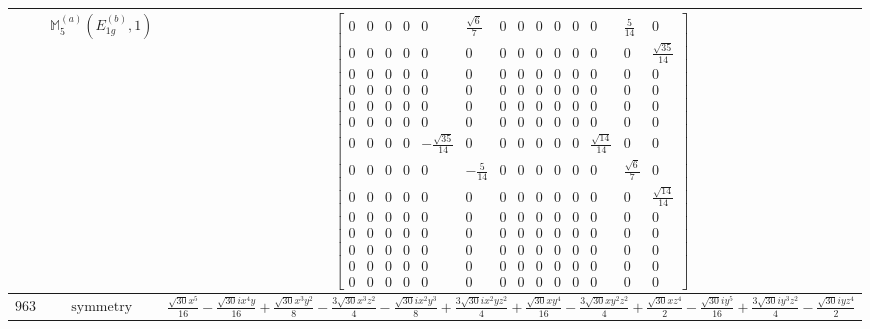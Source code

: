\documentclass[fleqn,8pt,landscape]{jsarticle}
\begin{document}
\begin{longtable}{ccc}
$  $ & $ \mathbb{M}_{5}^{(a)}(E_{1g}^{(b)},1) $ & $ \begin{bmatrix} 0 & 0 & 0 & 0 & 0 & \frac{\sqrt{6}}{7} & 0 & 0 & 0 & 0 & 0 & 0 & \frac{5}{14} & 0 \\ 0 & 0 & 0 & 0 & 0 & 0 & 0 & 0 & 0 & 0 & 0 & 0 & 0 & \frac{\sqrt{35}}{14} \\ 0 & 0 & 0 & 0 & 0 & 0 & 0 & 0 & 0 & 0 & 0 & 0 & 0 & 0 \\ 0 & 0 & 0 & 0 & 0 & 0 & 0 & 0 & 0 & 0 & 0 & 0 & 0 & 0 \\ 0 & 0 & 0 & 0 & 0 & 0 & 0 & 0 & 0 & 0 & 0 & 0 & 0 & 0 \\ 0 & 0 & 0 & 0 & 0 & 0 & 0 & 0 & 0 & 0 & 0 & 0 & 0 & 0 \\ 0 & 0 & 0 & 0 & - \frac{\sqrt{35}}{14} & 0 & 0 & 0 & 0 & 0 & 0 & \frac{\sqrt{14}}{14} & 0 & 0 \\ 0 & 0 & 0 & 0 & 0 & - \frac{5}{14} & 0 & 0 & 0 & 0 & 0 & 0 & \frac{\sqrt{6}}{7} & 0 \\ 0 & 0 & 0 & 0 & 0 & 0 & 0 & 0 & 0 & 0 & 0 & 0 & 0 & \frac{\sqrt{14}}{14} \\ 0 & 0 & 0 & 0 & 0 & 0 & 0 & 0 & 0 & 0 & 0 & 0 & 0 & 0 \\ 0 & 0 & 0 & 0 & 0 & 0 & 0 & 0 & 0 & 0 & 0 & 0 & 0 & 0 \\ 0 & 0 & 0 & 0 & 0 & 0 & 0 & 0 & 0 & 0 & 0 & 0 & 0 & 0 \\ 0 & 0 & 0 & 0 & 0 & 0 & 0 & 0 & 0 & 0 & 0 & 0 & 0 & 0 \\ 0 & 0 & 0 & 0 & 0 & 0 & 0 & 0 & 0 & 0 & 0 & 0 & 0 & 0 \end{bmatrix} $ \\ \hline
$ 963 $ & $ \text{symmetry} $ & $ \frac{\sqrt{30} x^{5}}{16} - \frac{\sqrt{30} i x^{4} y}{16} + \frac{\sqrt{30} x^{3} y^{2}}{8} - \frac{3 \sqrt{30} x^{3} z^{2}}{4} - \frac{\sqrt{30} i x^{2} y^{3}}{8} + \frac{3 \sqrt{30} i x^{2} y z^{2}}{4} + \frac{\sqrt{30} x y^{4}}{16} - \frac{3 \sqrt{30} x y^{2} z^{2}}{4} + \frac{\sqrt{30} x z^{4}}{2} - \frac{\sqrt{30} i y^{5}}{16} + \frac{3 \sqrt{30} i y^{3} z^{2}}{4} - \frac{\sqrt{30} i y z^{4}}{2} $ \\

\end{longtable}
\end{document}
